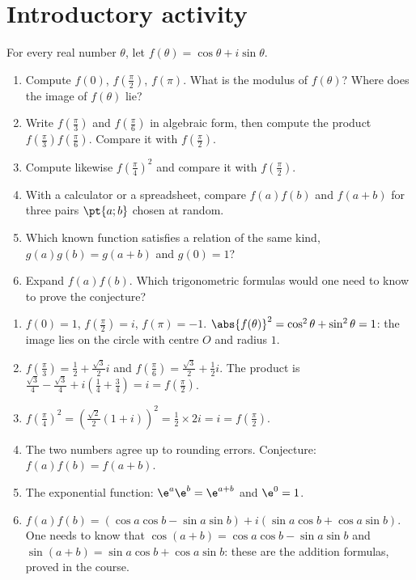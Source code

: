 \mxnewpage
\section{Introductory activity}
\begin{activity}
For every real number $\theta$, let $f(\theta)=\cos\theta+i\sin\theta$.
\begin{enumerate}
\item Compute $f(0)$, $f\left(\frac\pi2\right)$, $f(\pi)$. What is the modulus of $f(\theta)$? Where does the image of $f(\theta)$ lie?
\item Write $f\left(\frac\pi3\right)$ and $f\left(\frac\pi6\right)$ in algebraic form, then compute the product $f\left(\frac\pi3\right)f\left(\frac\pi6\right)$. Compare it with $f\left(\frac\pi2\right)$.
\item Compute likewise $f\left(\frac\pi4\right)^2$ and compare it with $f\left(\frac\pi2\right)$.
\item With a calculator or a spreadsheet, compare $f(a)f(b)$ and $f(a+b)$ for three pairs $\pt{a;b}$ chosen at random.
\item Which known function satisfies a relation of the same kind, $g(a)g(b)=g(a+b)$ and $g(0)=1$?
\item Expand $f(a)f(b)$. Which trigonometric formulas would one need to know to prove the conjecture?
\end{enumerate}
\end{activity}
\begin{solution}[Activity]
\begin{enumerate}
\item $f(0)=1$, $f\left(\frac\pi2\right)=i$, $f(\pi)=-1$. $\abs{f(\theta)}^2=\cos^2\theta+\sin^2\theta=1$: the image lies on the circle with centre $O$ and radius $1$.
\item $f\left(\frac\pi3\right)=\frac12+\frac{\sqrt3}2i$ and $f\left(\frac\pi6\right)=\frac{\sqrt3}2+\frac12i$. The product is $\frac{\sqrt3}4-\frac{\sqrt3}4+i\left(\frac14+\frac34\right)=i=f\left(\frac\pi2\right)$.
\item $f\left(\frac\pi4\right)^2=\left(\frac{\sqrt2}2(1+i)\right)^2=\frac12\times2i=i=f\left(\frac\pi2\right)$.
\item The two numbers agree up to rounding errors. Conjecture: $f(a)f(b)=f(a+b)$.
\item The exponential function: $\e^a\e^b=\e^{a+b}$ and $\e^0=1$.
\item $f(a)f(b)=(\cos a\cos b-\sin a\sin b)+i(\sin a\cos b+\cos a\sin b)$. One needs to know that $\cos(a+b)=\cos a\cos b-\sin a\sin b$ and $\sin(a+b)=\sin a\cos b+\cos a\sin b$: these are the addition formulas, proved in the course.
\end{enumerate}
\end{solution}
